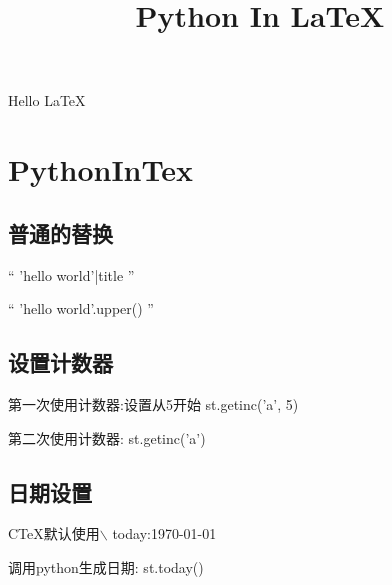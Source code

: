 \documentclass[fontset=windows]{article}
\title{Python In \LaTeX}
\author{}
\date{}
\begin{document}
\maketitle
    Hello{} \LaTeX

    \section{PythonInTex}
    \subsection{普通的替换}
    ``{{ 'hello world'|title }}''

    ``{{ 'hello world'.upper() }}''

    \subsection{设置计数器}
    第一次使用计数器:设置从5开始{{ st.getinc('a', 5) }}

    第二次使用计数器:{{ st.getinc('a') }}

    \subsection{日期设置}
    CTeX默认使用$\backslash$ today:\today

    调用python生成日期:{{ st.today() }}
\end{document}
